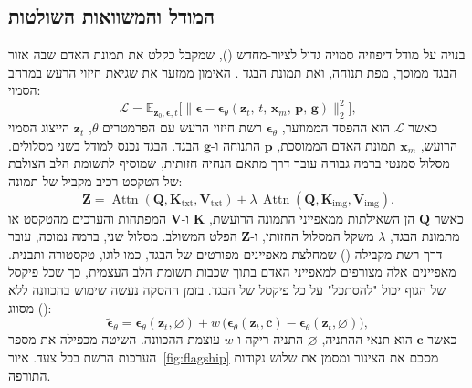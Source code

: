 \subsection{המודל והמשוואות השולטות}
 בנויה על מודל דיפוזיה סמויה גדול לציור-מחדש (), שמקבל כקלט את תמונת האדם שבה אזור הבגד ממוסך, מפת תנוחה, ואת תמונת הבגד \cite{choi2024idmvton}. האימון ממזער את שגיאת חיזוי הרעש במרחב הסמוי:
\begin{equation}
\mathcal{L} = \mathbb{E}_{\mathbf{z}_0,\boldsymbol{\epsilon},t}\Big[\big\lVert \boldsymbol{\epsilon} - \boldsymbol{\epsilon}_\theta(\mathbf{z}_t,\,t,\,\mathbf{x}_m,\,\mathbf{p},\,\mathbf{g}) \big\rVert_2^2\Big],
\label{eq:ldmloss}
\end{equation}
כאשר $\mathcal{L}$ הוא ההפסד הממוזער, $\boldsymbol{\epsilon}_\theta$ רשת חיזוי הרעש עם הפרמטרים $\theta$, $\mathbf{z}_t$ הייצוג הסמוי הרועש, $\mathbf{x}_m$ תמונת האדם הממוסכת, $\mathbf{p}$ התנוחה ו-$\mathbf{g}$ הבגד. הבגד נכנס למודל בשני מסלולים. מסלול סמנטי ברמה גבוהה עובר דרך מתאם הנחיה חזותית, שמוסיף לתשומת הלב הצולבת של הטקסט רכיב מקביל של תמונה:
\begin{equation}
\mathbf{Z} = \operatorname{Attn}(\mathbf{Q},\mathbf{K}_{\text{txt}},\mathbf{V}_{\text{txt}}) + \lambda\,\operatorname{Attn}(\mathbf{Q},\mathbf{K}_{\text{img}},\mathbf{V}_{\text{img}}).
\label{eq:ipadapter}
\end{equation}
כאשר $\mathbf{Q}$ הן השאילתות ממאפייני התמונה הרועשת, $\mathbf{K}$ ו-$\mathbf{V}$ המפתחות והערכים מהטקסט או מתמונת הבגד, $\lambda$ משקל המסלול החזותי, ו-$\mathbf{Z}$ הפלט המשולב. מסלול שני, ברמה נמוכה, עובר דרך רשת  מקבילה () שמחלצת מאפיינים מפורטים של הבגד, כמו לוגו, טקסטורה ותבנית. מאפיינים אלה מצורפים למאפייני האדם בתוך שכבות תשומת הלב העצמית, כך שכל פיקסל של הגוף יכול "להסתכל" על כל פיקסל של הבגד. בזמן ההסקה נעשה שימוש בהכוונה ללא מסווג ():
\begin{equation}
\tilde{\boldsymbol{\epsilon}}_\theta = \boldsymbol{\epsilon}_\theta(\mathbf{z}_t,\varnothing) + w\,\big(\boldsymbol{\epsilon}_\theta(\mathbf{z}_t,\mathbf{c}) - \boldsymbol{\epsilon}_\theta(\mathbf{z}_t,\varnothing)\big),
\label{eq:cfg}
\end{equation}
כאשר $\mathbf{c}$ הוא תנאי ההתניה, $\varnothing$ התניה ריקה ו-$w$ עוצמת ההכוונה. השיטה מכפילה את מספר הערכות הרשת בכל צעד. איור~\ref{fig:flagship} מסכם את הצינור ומסמן את שלוש נקודות התורפה.


